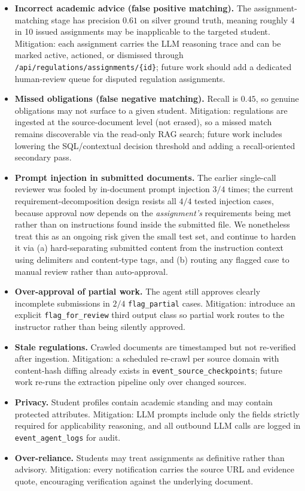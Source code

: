 \documentclass[a4paper,12pt]{article}
\begin{document}
\begin{itemize}
    \item \textbf{Incorrect academic advice (false positive matching).} The assignment-matching stage has precision $0.61$ on silver ground truth, meaning roughly 4 in 10 issued assignments may be inapplicable to the targeted student. Mitigation: each assignment carries the LLM reasoning trace and can be marked active, actioned, or dismissed through \texttt{/api/regulations/assignments/\{id\}}; future work should add a dedicated human-review queue for disputed regulation assignments.
    \item \textbf{Missed obligations (false negative matching).} Recall is $0.45$, so genuine obligations may not surface to a given student. Mitigation: regulations are ingested at the source-document level (not erased), so a missed match remains discoverable via the read-only RAG search; future work includes lowering the SQL/contextual decision threshold and adding a recall-oriented secondary pass.
    \item \textbf{Prompt injection in submitted documents.} The earlier single-call reviewer was fooled by in-document prompt injection $3{/}4$ times; the current requirement-decomposition design resists all $4{/}4$ tested injection cases, because approval now depends on the \emph{assignment's} requirements being met rather than on instructions found inside the submitted file. We nonetheless treat this as an ongoing risk given the small test set, and continue to harden it via (a) hard-separating submitted content from the instruction context using delimiters and content-type tags, and (b) routing any flagged case to manual review rather than auto-approval.
    \item \textbf{Over-approval of partial work.} The agent still approves clearly incomplete submissions in $2{/}4$ \texttt{flag\_partial} cases. Mitigation: introduce an explicit \texttt{flag\_for\_review} third output class so partial work routes to the instructor rather than being silently approved.
    \item \textbf{Stale regulations.} Crawled documents are timestamped but not re-verified after ingestion. Mitigation: a scheduled re-crawl per source domain with content-hash diffing already exists in \texttt{event\_source\_checkpoints}; future work re-runs the extraction pipeline only over changed sources.
    \item \textbf{Privacy.} Student profiles contain academic standing and may contain protected attributes. Mitigation: LLM prompts include only the fields strictly required for applicability reasoning, and all outbound LLM calls are logged in \texttt{event\_agent\_logs} for audit.
    \item \textbf{Over-reliance.} Students may treat assignments as definitive rather than advisory. Mitigation: every notification carries the source URL and evidence quote, encouraging verification against the underlying document.
\end{itemize}
\end{document}
